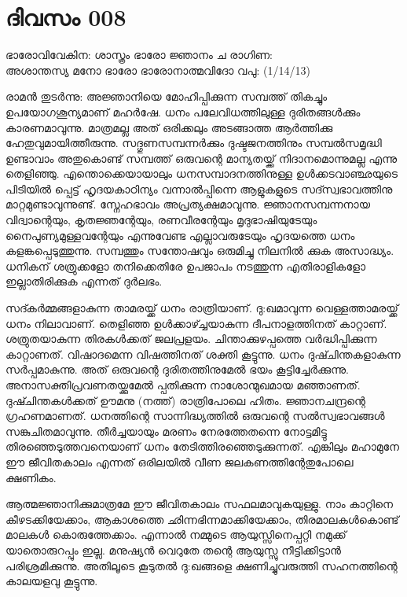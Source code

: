 \newpage
\section{ദിവസം 008}

\begin{center}
ഭാരോവിവേകിന: ശാസ്ത്രം ഭാരോ ജ്ഞാനം ച രാഗിണ:\\
അശാന്തസ്യ മനോ ഭാരോ ഭാരോനാത്മവിദോ വപു:  (1/14/13)\\
\end{center}


രാമന്‍ തുടര്‍ന്നു: അജ്ഞാനിയെ മോഹിപ്പിക്കുന്ന സമ്പത്ത്‌ തികച്ചും ഉപയോഗശൂന്യമാണ്‌ മഹര്‍ഷേ. ധനം പലേവിധത്തിലുള്ള ദുരിതങ്ങള്‍ക്കും കാരണമാവുന്നു. മാത്രമല്ല അത്‌ ഒരിക്കലും അടങ്ങാത്ത ആര്‍ത്തിക്കു ഹേതുവുമായിത്തീരുന്നു. സദ്ഗുണസമ്പന്നര്‍ക്കും ദുഷ്ടജനത്തിനും സമ്പല്‍സമൃദ്ധി ഉണ്ടാവാം അതുകൊണ്ട്‌ സമ്പത്ത്‌ ഒരുവന്റെ മാന്യതയ്ക്ക്‌ നിദാനമൊന്നുമല്ല എന്നു തെളിഞ്ഞു. എന്തൊക്കെയായാലും ധനസമ്പാദനത്തിനുള്ള ഉള്‍ക്കടവാഞ്ഛയുടെ പിടിയില്‍ പ്പെട്ട്‌ ഹൃദയകാഠിന്യം വന്നാല്‍പ്പിന്നെ ആളുകളുടെ സദ്സ്വഭാവത്തിനു മാറ്റമുണ്ടാവുന്നുണ്ട്‌. സ്നേഹഭാവം അപ്രത്യക്ഷമാവുന്നു. ജ്ഞാനസമ്പന്നനായ വിദ്വാന്റെയും, കൃതജ്ഞന്റേയും, രണവീരന്റേയും മൃദുഭാഷിയുടേയും നൈപുണ്യമുള്ളവന്റേയും എന്നുവേണ്ട എല്ലാവരുടേയും ഹൃദയത്തെ ധനം കളങ്കപ്പെടുത്തുന്നു. സമ്പത്തും സന്തോഷവും ഒരുമിച്ചു നിലനില്‍ ക്കുക അസാദ്ധ്യം. ധനികന്‌ ശത്രുക്കളോ തനിക്കെതിരേ ഉപജാപം നടത്തുന്ന എതിരാളികളോ ഇല്ലാതിരിക്കുക എന്നത്‌ ദുര്‍ലഭം. 

സദ്കര്‍മ്മങ്ങളാകുന്ന താമരയ്ക്ക്‌ ധനം രാത്രിയാണ്‌. ദു:ഖമാവുന്ന വെള്ളത്താമരയ്ക്ക്‌ ധനം നിലാവാണ്‌. തെളിഞ്ഞ ഉള്‍ക്കാഴ്ച്ചയാകുന്ന ദീപനാളത്തിനത്‌ കാറ്റാണ്‌. ശത്രുതയാകുന്ന തിരകള്‍ക്കത്‌ ജലപ്രളയം. ചിന്താക്കുഴപ്പത്തെ വര്‍ദ്ധിപ്പിക്കുന്ന കാറ്റാണത്‌. വിഷാദമെന്ന വിഷത്തിനത്‌ ശക്തി കൂട്ടുന്നു. ധനം ദുഷ്ചിന്തകളാകുന്ന സര്‍പ്പമാകുന്നു. അത്‌ ഒരുവന്റെ ദുരിതത്തിനുമേല്‍ ഭയം കൂട്ടിച്ചേര്‍ക്കുന്നു. അനാസക്തിപ്രവണതയ്ക്കുമേല്‍ പ്പതിക്കുന്ന നാശോന്മുഖമായ മഞ്ഞാണത്‌. ദുഷ്ചിന്തകള്‍ക്കത്‌ ഊമനു (നത്ത്‌) രാത്രിപോലെ ഹിതം. ജ്ഞാനചന്ദ്രന്റെ ഗ്രഹണമാണത്‌. ധനത്തിന്റെ സാന്നിദ്ധ്യത്തില്‍ ഒരുവന്റെ സല്‍സ്വഭാവങ്ങള്‍ സങ്കുചിതമാവുന്നു. തീര്‍ച്ചയായും മരണം നേരത്തേതന്നെ നോട്ടമിട്ടു തിരഞ്ഞെടുത്തവനെയാണ്‌ ധനം തേടിത്തിരഞ്ഞെടുക്കുന്നത്‌. എങ്കിലും മഹാമുനേ ഈ ജീവിതകാലം എന്നത്‌ ഒരിലയില്‍ വീണ ജലകണത്തിന്റേതുപോലെ ക്ഷണികം. 


ആത്മജ്ഞാനിക്കുമാത്രമേ ഈ ജീവിതകാലം സഫലമാവുകയുള്ളു. നാം കാറ്റിനെ കീഴടക്കിയേക്കാം, ആകാശത്തെ ഛിന്നഭിന്നമാക്കിയേക്കാം, തിരമാലകള്‍കൊണ്ട്‌ മാലകള്‍ കൊരുത്തേക്കാം. എന്നാല്‍ നമ്മുടെ ആയുസ്സിനെപ്പറ്റി നമുക്ക്‌ യാതൊരുറപ്പും ഇല്ല. മനുഷ്യന്‍ വെറുതേ തന്റെ ആയുസ്സു നീട്ടിക്കിട്ടാന്‍ പരിശ്രമിക്കുന്നു. അതിലൂടെ കൂടുതല്‍ ദു:ഖങ്ങളെ ക്ഷണിച്ചുവരുത്തി സഹനത്തിന്റെ കാലയളവു കൂട്ടുന്നു.


